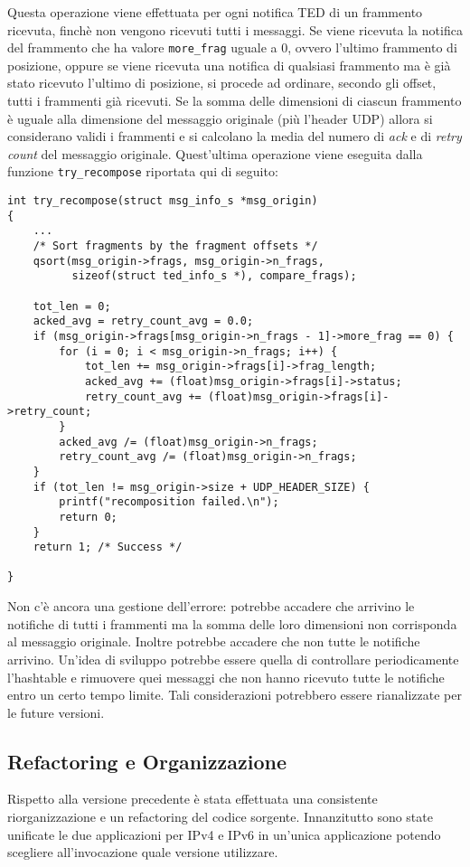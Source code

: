\documentclass[a4paper,10pt]{article}
\begin{document}
Questa operazione viene effettuata per ogni notifica TED di un frammento
ricevuta, finchè non vengono ricevuti tutti i messaggi.
Se viene ricevuta la notifica del frammento che ha
valore \texttt{more\_frag} uguale a 0, ovvero l'ultimo frammento di
posizione, oppure se viene ricevuta una notifica di qualsiasi frammento
ma è già stato ricevuto l'ultimo di posizione,
si procede ad ordinare, secondo gli offset, tutti i frammenti già ricevuti. 
Se la somma delle dimensioni di ciascun frammento è uguale alla
dimensione del messaggio originale (più l'header UDP)  allora si considerano
 validi i frammenti e si calcolano la media del numero di \emph{ack} e di
\emph{retry count} del messaggio originale.
Quest'ultima operazione viene eseguita dalla funzione
\texttt{try\_recompose} riportata qui di seguito:

\begin{lstlisting}
int try_recompose(struct msg_info_s *msg_origin)
{
	...
	/* Sort fragments by the fragment offsets */
	qsort(msg_origin->frags, msg_origin->n_frags,
	      sizeof(struct ted_info_s *), compare_frags);
	
	tot_len = 0;
	acked_avg = retry_count_avg = 0.0;
	if (msg_origin->frags[msg_origin->n_frags - 1]->more_frag == 0) {
		for (i = 0; i < msg_origin->n_frags; i++) { 
			tot_len += msg_origin->frags[i]->frag_length;
			acked_avg += (float)msg_origin->frags[i]->status;	
			retry_count_avg += (float)msg_origin->frags[i]->retry_count;
		}
		acked_avg /= (float)msg_origin->n_frags;
		retry_count_avg /= (float)msg_origin->n_frags;
	}
	if (tot_len != msg_origin->size + UDP_HEADER_SIZE) {
		printf("recomposition failed.\n");
		return 0;
	}
	return 1; /* Success */

}
\end{lstlisting}


Non c'è ancora una gestione dell'errore: potrebbe accadere che arrivino
le notifiche di tutti
i frammenti ma la somma delle loro dimensioni non corrisponda al
messaggio originale. Inoltre potrebbe accadere che non tutte le
notifiche arrivino. Un'idea di sviluppo potrebbe essere quella di
controllare periodicamente l'hashtable e rimuovere quei messaggi che non
hanno ricevuto tutte le notifiche entro un certo tempo limite. 
Tali considerazioni potrebbero essere rianalizzate per le future versioni. 

\subsection{Refactoring e Organizzazione}
Rispetto alla versione precedente è stata effettuata una consistente
riorganizzazione e un refactoring del codice sorgente.
Innanzitutto sono state unificate le due applicazioni per IPv4 e IPv6 in
un'unica applicazione potendo scegliere all'invocazione quale versione
utilizzare. \\
\end{document}
